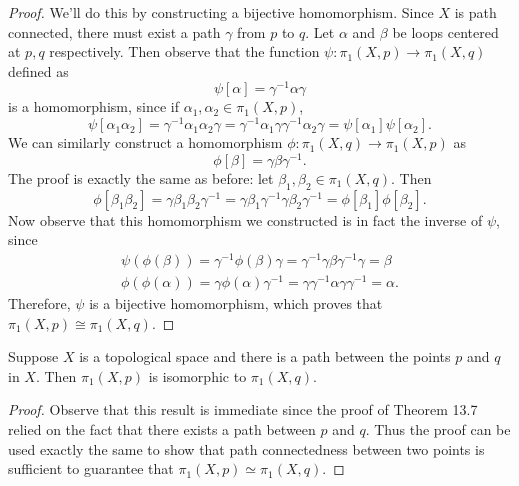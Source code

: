 \documentclass[a4paper,12pt,twoside]{hmcpset}
\begin{document}
\begin{proof}
    We'll do this by constructing a bijective homomorphism. Since $X$
    is path connected, there must exist a path $\gamma$ from $p$ to
    $q$. Let $\alpha$ and $\beta$ be loops centered at $p, q$
    respectively. Then observe that the function $ \psi :\pi_1(X, p) \to
    \pi_1(X, q)$ defined as
    \[
        \psi[\alpha] = \gamma^{-1}\alpha\gamma  
    \]
    is a homomorphism, since if $\alpha_1, \alpha_2 \in \pi_1(X, p)$,
    \[
        \psi[\alpha_1\alpha_2] = \gamma^{-1}\alpha_1\alpha_2\gamma
        = \gamma^{-1}\alpha_1\gamma \gamma^{-1}\alpha_2\gamma
        = \psi[\alpha_1]\psi[\alpha_2].
    \]
    We can similarly construct a homomorphism $\phi: \pi_1(X, q) \to
    \pi_1(X, p)$ as 
    \[
        \phi[\beta] = \gamma\beta\gamma^{-1}. 
    \]
    The proof is exactly the same as before: let $\beta_1, \beta_2 \in
    \pi_1(X, q)$. Then
    \[
        \phi[\beta_1\beta_2] = \gamma\beta_1\beta_2\gamma^{-1}
        = \gamma\beta_1\gamma^{-1} \gamma\beta_2\gamma^{-1}
        = \phi[\beta_1]\phi[\beta_2].
    \]
    Now observe that this homomorphism we constructed is in fact the
    inverse of $\psi$, since 
    \begin{gather*}
        \psi(\phi(\beta))= \gamma^{-1}\phi(\beta)\gamma = \gamma^{-1}\gamma\beta\gamma^{-1}\gamma = \beta\\
        \phi(\phi(\alpha)) = \gamma\phi(\alpha)\gamma^{-1} = \gamma\gamma^{-1}\alpha\gamma\gamma^{-1} = \alpha.
    \end{gather*}
    Therefore, $\psi$ is a bijective homomorphism, which proves that 
    $\pi_1(X, p) \cong \pi_1(X, q)$.
    
\end{proof}

\begin{problem}[Corollay 13.8]
    Suppose $X$ is a topological space and there is a path between the
    points $p$ and $q$ in $X$. Then $\pi_1(X, p)$ is isomorphic to 
    $\pi_1(X, q)$.
\end{problem}

\begin{proof}
Observe that this result is immediate since the proof of Theorem 13.7
relied on the fact that there exists a path between $p$ and $q$. Thus
the proof can be used exactly the same to show that path connectedness
between two points is sufficient to guarantee that $\pi_1(X, p) \simeq
\pi_1(X, q)$.


\end{proof}
\end{document}
